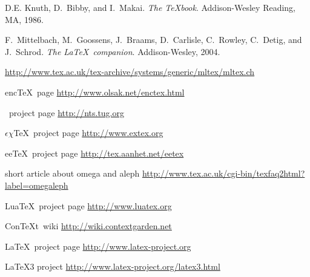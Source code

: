\documentclass{scrartcl}
\def\ConTeXt{Con\TeX{}t}
\def\mynode#1#2#3#4{
  \node (#1) at (#2) {
    \cooltooltip{#1}{#3}{#3}{}{#4\strut}
  };
}
\begin{document}
\newpage
\normalsize
\begin{thebibliography}{10}
\label{sec:refs}


D.E. Knuth, D.~Bibby, and I.~Makai.
\newblock \emph{{The \TeX book}}.
\newblock Addison-Wesley Reading, MA, 1986.

F.~Mittelbach, M.~Goossens, J.~Braams, D.~Carlisle, C.~Rowley, C.~Detig, and
  J.~Schrod.
\newblock \emph{{The \LaTeX\ companion}}.
\newblock Addison-Wesley, 2004.


\newblock \url{http://www.tex.ac.uk/tex-archive/systems/generic/mltex/mltex.ch}

{enc\TeX\ page}
\newblock \url{http://www.olsak.net/enctex.html}

{\NTS\ project page}
\newblock \url{http://nts.tug.org}

{$\epsilon\chi$\TeX\ project page}
\newblock \url{http://www.extex.org}

{ee\TeX\ project page}
\newblock \url{http://tex.aanhet.net/eetex}

{short article about omega and aleph}
\newblock \url{http://www.tex.ac.uk/cgi-bin/texfaq2html?label=omegaleph}

{Lua\TeX\ project page}
\newblock \url{http://www.luatex.org}



\ConTeXt\ wiki
\newblock \url{http://wiki.contextgarden.net}

{\LaTeX\ project page}
\newblock \url{http://www.latex-project.org}

{\LaTeX3 project}
\newblock \url{http://www.latex-project.org/latex3.html}

\end{thebibliography}
\end{document}
